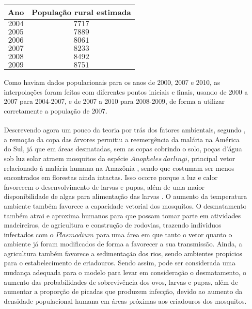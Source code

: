 \\\\
\begin{adjustwidth}{0cm}{}
\begin{center}
\renewcommand{\arraystretch}{1.5}
\begin{tabular}{|c | c|} 
 \hline
 \textbf{Ano} & \textbf{População rural estimada}\\ 
 \hline
$2004$ & $7717$ \\
 \hline
 $2005$ & $7889$ \\
 \hline
 $2006$ & $8061$ \\
 \hline
 $2007$ & $8233$ \\
 \hline
 $2008$ & $8492$ \\
 \hline
 $2009$ & $8751$ \\
 \hline
\end{tabular}
\end{center}
\end{adjustwidth}

\vspace{1cm}
Como haviam dados populacionais para os anos de 2000, 2007 e 2010, as interpolações foram feitas com diferentes pontos iniciais e finais, usando de 2000 a 2007 para 2004-2007, e de 2007 a 2010 para 2008-2009, de forma a utilizar corretamente a população de 2007.
\\\\
Descrevendo agora um pouco da teoria por trás dos fatores ambientais, 
segundo \cite{Norris2004}, 
a remoção da copa das árvores permitiu a reemergência da malária 
na América do Sul, já que em áreas desmatadas, 
sem as copas cobrindo o solo, poças d'água sob luz solar atraem mosquitos 
da espécie $Anopheles \ darlingi$, principal vetor relacionado à malária 
humana na Amazônia \cite{infoAnopheles}, sendo que costumam ser menos encontrados em 
florestas ainda intactas. Isso ocorre porque a luz e calor favorecem o 
desenvolvimento de larvas e pupas, além de uma maior disponibilidade de 
algas para alimentação das larvas \cite{article_alteracoesambientais}. O aumento da temperatura 
ambiente também favorece a capacidade vetorial dos mosquitos. O desmatamento 
também atrai e aproxima humanos para que possam tomar parte em atividades 
madeireiras, de agricultura e construção de rodovias, trazendo indíviduos 
infectados com o $Plasmodium$ para uma área em que tanto o vetor quanto o 
ambiente já foram modificados de forma a favorecer a sua transmissão. 
Ainda, a agricultura também favorece a sedimentação dos rios, sendo 
ambientes propícios para o estabelecimento de criadouros. Sendo assim, 
pode ser considerada uma mudança adequada para o modelo para levar 
em consideração o desmatamento, o aumento das probabilidades de 
sobrevivência dos ovos, larvas e pupas, além de aumentar a proporção 
de picadas que produzem infecção, devido ao aumento da densidade 
populacional humana em áreas próximas aos criadouros dos mosquitos.
